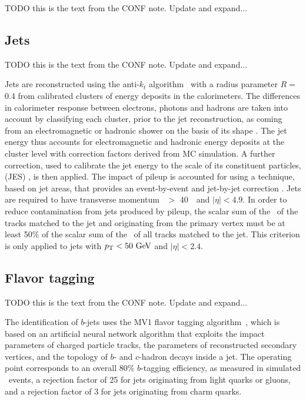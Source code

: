 {\color{red} TODO this is the text from the CONF note. Update and expand...}

\FloatBarrier
\subsection{Jets} 
\label{sec:jets}

{\color{red} TODO this is the text from the CONF note. Update and expand...}

Jets are reconstructed using the anti-$k_{t}$
algorithm~\cite{Cacciari:2008gp, Cacciari:2005hq} with a radius
parameter $R = $ 0.4 from calibrated clusters of energy deposits in
the calorimeters. The differences in calorimeter response between
electrons, photons and hadrons are taken into account by classifying
each cluster, prior to the jet reconstruction, as coming from an
electromagnetic or hadronic shower on the basis of its shape
\cite{JES}.  The jet energy thus accounts for electromagnetic
and hadronic energy deposits at the cluster level with correction
factors derived from MC simulation.  A further correction,
used to calibrate the jet energy to the scale of its constituent
particles, (JES) \cite{JES,JES2}, is then applied.  The impact of
pileup is accounted for using
a technique, based on jet areas, that provides an event-by-event and
jet-by-jet correction \cite{Cacciari:2007fd}.  Jets are required
to have transverse momentum \pt\ $>$ 40~\GeV\ and $|\eta| < 4.9$.
In order to reduce contamination from jets produced by pileup,
the scalar sum of the \pt\ of the tracks matched to the jet and
originating from the primary vertex must be at least 50\% of the
scalar sum of the \pt\ of all tracks matched to the jet.  This
criterion is only applied to jets with $\pt < 50 \GeV$ and $|\eta| < 2.4$.

\FloatBarrier
\subsection{Flavor tagging} 
\label{sec:flavor_tagging}

{\color{red} TODO this is the text from the CONF note. Update and expand...}

The identification of $b$-jets uses the MV1 flavor tagging
algorithm~\cite{ATLAS-CONF-2014-004, ATLAS-CONF-2014-046}, which is
based on an artificial neural network
algorithm that exploits the impact parameters of charged particle
tracks, the parameters of reconstructed secondary vertices, and the
topology of $b$- and $c$-hadron decays inside a jet.  The operating
point corresponds to an overall 80\% $b$-tagging efficiency, as
measured in simulated \TTBAR\ events, a rejection factor of 25 for jets
originating from light quarks or gluons, and a rejection factor of
3 for jets originating from charm quarks.

